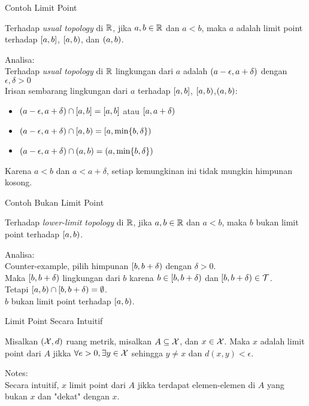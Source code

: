 \begin{frame}{Contoh Limit Point}
    \begin{tcolorbox}[enhanced,title=Contooh 41 (a), frame style tile={width=\paperwidth}{\wallpaper}]
        Terhadap \textit{usual topology} di $\mathbb{R}$, jika $a,b\in\mathbb{R}$ dan $a<b$,
        maka $a$ adalah limit point terhadap $[a,b]$, $[a,b)$, dan $(a,b)$.
    \end{tcolorbox}
Analisa: \\
Terhadap \textit{usual topology} di $\mathbb{R}$ lingkungan dari $a$ adalah 
$(a-\epsilon,a+\delta)$ dengan $\epsilon,\delta > 0$\\
Irisan sembarang lingkungan dari $a$ terhadap $[a,b]$, $[a,b)$,$(a,b)$:
\begin{itemize}
    \item $(a-\epsilon,a+\delta)\cap[a,b] = [a,b]$ atau $[a,a+\delta)$
    \item $(a-\epsilon,a+\delta)\cap[a,b) = [a,\min\{b,\delta\})$
    \item $(a-\epsilon,a+\delta)\cap(a,b) = (a,\min\{b,\delta\})$
\end{itemize}
Karena $a<b$ dan $a<a+\delta$, setiap kemungkinan ini tidak mungkin himpunan kosong.
\end{frame}

\begin{frame}{Contoh Bukan Limit Point}
    \begin{tcolorbox}[enhanced,title=Contooh 41 (b), frame style tile={width=\paperwidth}{\wallpaper}]
        Terhadap \textit{lower-limit topology} di $\mathbb{R}$, jika $a,b\in\mathbb{R}$ dan $a<b$,
        maka $b$ bukan limit point terhadap $[a,b)$.
    \end{tcolorbox}
Analisa: \\
Counter-example, pilih himpunan $[b,b+\delta)$ dengan $\delta > 0$. \\
Maka $[b,b+\delta)$ lingkungan dari $b$ karena $b\in[b,b+\delta)$ 
dan $[b,b+\delta)\in \mathcal{T}$.\\
Tetapi $[a,b)\cap[b,b+\delta)=\emptyset$.\\
$b$ bukan limit point terhadap $[a,b)$.
\end{frame}

\begin{frame}{Limit Point Secara Intuitif}
    \begin{tcolorbox}[enhanced,title=Contooh 42, frame style tile={width=\paperwidth}{\wallpaper}]
        Misalkan $(\mathcal{X},d)$ ruang metrik, misalkan $A\subseteq \mathcal{X}$, dan $x\in\mathcal{X}$.
        Maka $x$ adalah limit point dari $A$ jikka $\forall e>0, \exists y\in\mathcal{X}$ 
        sehingga $y\neq x$ dan $d(x,y)<\epsilon$.
    \end{tcolorbox}
Notes:\\
Secara intuitif, $x$ limit point dari $A$ jikka terdapat elemen-elemen di $A$ yang 
bukan $x$ dan "dekat" dengan $x$.
\end{frame}
